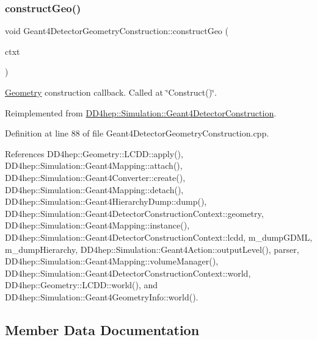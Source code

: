 \subsubsection{\texorpdfstring{construct\+Geo()}{constructGeo()}}
{\footnotesize\ttfamily void Geant4\+Detector\+Geometry\+Construction\+::construct\+Geo (\begin{DoxyParamCaption}\item[{\hyperlink{class_d_d4hep_1_1_simulation_1_1_geant4_detector_construction_context}{Geant4\+Detector\+Construction\+Context} $\ast$}]{ctxt }\end{DoxyParamCaption})\hspace{0.3cm}{\ttfamily [virtual]}}



\hyperlink{namespace_d_d4hep_1_1_geometry}{Geometry} construction callback. Called at \char`\"{}\+Construct()\char`\"{}. 



Reimplemented from \hyperlink{class_d_d4hep_1_1_simulation_1_1_geant4_detector_construction_a91ab552e6ee76df9e0ebff3351863ebd}{D\+D4hep\+::\+Simulation\+::\+Geant4\+Detector\+Construction}.



Definition at line 88 of file Geant4\+Detector\+Geometry\+Construction.\+cpp.



References D\+D4hep\+::\+Geometry\+::\+L\+C\+D\+D\+::apply(), D\+D4hep\+::\+Simulation\+::\+Geant4\+Mapping\+::attach(), D\+D4hep\+::\+Simulation\+::\+Geant4\+Converter\+::create(), D\+D4hep\+::\+Simulation\+::\+Geant4\+Mapping\+::detach(), D\+D4hep\+::\+Simulation\+::\+Geant4\+Hierarchy\+Dump\+::dump(), D\+D4hep\+::\+Simulation\+::\+Geant4\+Detector\+Construction\+Context\+::geometry, D\+D4hep\+::\+Simulation\+::\+Geant4\+Mapping\+::instance(), D\+D4hep\+::\+Simulation\+::\+Geant4\+Detector\+Construction\+Context\+::lcdd, m\+\_\+dump\+G\+D\+ML, m\+\_\+dump\+Hierarchy, D\+D4hep\+::\+Simulation\+::\+Geant4\+Action\+::output\+Level(), parser, D\+D4hep\+::\+Simulation\+::\+Geant4\+Mapping\+::volume\+Manager(), D\+D4hep\+::\+Simulation\+::\+Geant4\+Detector\+Construction\+Context\+::world, D\+D4hep\+::\+Geometry\+::\+L\+C\+D\+D\+::world(), and D\+D4hep\+::\+Simulation\+::\+Geant4\+Geometry\+Info\+::world().



\subsection{Member Data Documentation}
\hypertarget{class_d_d4hep_1_1_simulation_1_1_geant4_detector_geometry_construction_abb2b35066d2a33cd98aaf1d960ce60cc}{}\label{class_d_d4hep_1_1_simulation_1_1_geant4_detector_geometry_construction_abb2b35066d2a33cd98aaf1d960ce60cc} 

